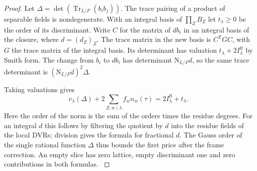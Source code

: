 \begin{proof}
Let \(\Delta=\det(\operatorname{Tr}_{L/F}(b_i b_j))\).
The trace pairing of a product of separable fields is
nondegenerate. With an integral basis of \(\prod_Z B_Z\)
let \(t_\lambda\ge0\) be the order of its discriminant.
Write \(C\) for the matrix of \(d b_i\) in an integral
basis of the closure, where \(d=(d_Z)_Z\).
The trace matrix in the new basis is \(C^{\mathsf T}GC\),
with \(G\) the trace matrix of the integral basis. Its
determinant has valuation \(t_\lambda+2I_\lambda^{\mathrm{ff}}\)
by Smith form. The change from \(b_i\) to \(d b_i\)
has determinant \(\mathrm N_{L/F}d\), so the same trace
determinant is \((\mathrm N_{L/F}d)^2\Delta\).

Taking valuations gives
\begin{equation}\label{eq:slice-discriminant-order}
 v_\lambda(\Delta)+2\sum_{Z,w\mid\lambda} f_w n_w(\tau)
     =2I^{\mathrm{ff}}_\lambda+t_\lambda .
\end{equation}
Here the order of the norm is the sum of the orders times
the residue degrees. For an integral \(d\) this follows by
filtering the quotient by \(d\) into the residue fields
of the local DVRs; division gives the formula for
fractional \(d\). The Gauss order of the single rational
function \(\Delta\) thus bounds the first price after the
frame correction. An empty slice has zero lattice, empty
discriminant one and zero contributions in both formulas.
\cite{dvr-slice}\label{cor:slice-orders-3}
\end{proof}
